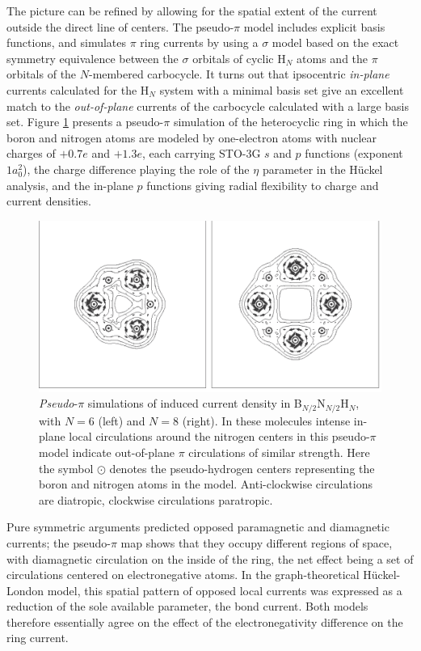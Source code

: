 The picture can be refined by allowing for the spatial extent of the current outside the direct line of centers. The pseudo-$\pi$
model \cite{r24} includes explicit basis functions, and simulates $\pi$ ring currents by using a $\sigma$ model based on
the exact symmetry equivalence between the $\sigma$ orbitals of cyclic H$_N$ atoms and the $\pi$ orbitals of the
$N$-membered carbocycle. It turns out that ipsocentric \textit{in-plane} currents calculated for the H$_N$ system with
a minimal basis set give an excellent match to the \textit{out-of-plane} currents of the carbocycle calculated with a large
basis set. Figure \ref{ch5.fig.f03} presents a pseudo-$\pi$ simulation of the heterocyclic ring in which the boron and nitrogen
atoms are modeled by one-electron atoms with nuclear charges of $+0.7e$ and $+1.3e$, each carrying STO-3G $s$ and $p$
functions (exponent $1a_{0}^{2}$), the charge difference playing the role of the $\eta$ parameter in the H\"uckel analysis,
and the in-plane $p$ functions giving radial flexibility to charge and current densities. 
\begin{figure}[htp]
\begin{center}
\includegraphics{huckel/figures/fig3.eps}
\end{center}
\caption{\textit{Pseudo}-$\pi$ simulations of induced current density in B$_{N/2}$N$_{N/2}$H$_N$, with $N=6$ (left) and 
$N=8$ (right). In these molecules intense in-plane local circulations around the nitrogen centers in this pseudo-$\pi$ model
indicate out-of-plane $\pi$ circulations of similar strength. Here the symbol $\odot$ denotes the pseudo-hydrogen centers
representing the boron and nitrogen atoms in the model. Anti-clockwise circulations are diatropic, clockwise circulations
paratropic.}
\label{ch5.fig.f03}
\end{figure}
Pure symmetric arguments predicted
opposed paramagnetic and diamagnetic currents; the pseudo-$\pi$ map shows that they occupy different regions of space,
with diamagnetic circulation on the inside of the ring, the net effect being a set of circulations centered on electronegative atoms.
In the graph-theoretical H\"uckel-London model, this spatial pattern of opposed local currents was expressed as a reduction
of the sole available parameter, the bond current. Both models therefore essentially agree on the effect of the electronegativity
difference on the ring current.

